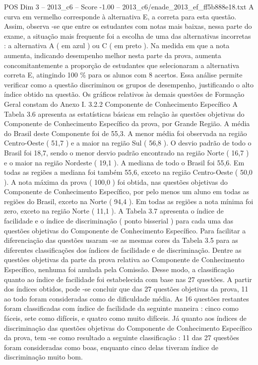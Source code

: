 \begin{textsample}{POS Dim 3 – 2013\_c6 – Score -1.00 – 2013\_c6/enade\_2013\_ef\_ff5b888e18.txt}
A curva em vermelho corresponde à alternativa E, a correta para esta questão.
Assim, observa -se que entre os estudantes com notas mais baixas, nessa parte do exame, a situação mais frequente foi a escolha de uma das alternativas incorretas : a alternativa A ( em azul ) ou C ( em preto ).
Na medida em que a nota aumenta, indicando desempenho melhor nesta parte da prova, aumenta concomitantemente a proporção de estudantes que selecionaram a alternativa correta E, atingindo 100 \% para os alunos com 8 acertos.
Essa análise permite verificar como a questão discriminou os grupos de desempenho, justificando o alto índice obtido na questão.
Os gráficos relativos às demais questões de Formação Geral constam do Anexo I. 3.2.2 Componente de Conhecimento Específico A Tabela 3.6 apresenta as estatísticas básicas em relação às questões objetivas do Componente de Conhecimento Específico da prova, por Grande Região.
A média do Brasil deste Componente foi de 55,3.
A menor média foi observada na região Centro-Oeste ( 51,7 ) e a maior na região Sul ( 56,8 ).
O desvio padrão de todo o Brasil foi 18,7, sendo o menor desvio padrão encontrado na região Norte ( 16,7 ) e o maior na região Nordeste ( 19,1 ).
A mediana de todo o Brasil foi 55,6.
Em todas as regiões a mediana foi também 55,6, exceto na região Centro-Oeste ( 50,0 ).
A nota máxima da prova ( 100,0 ) foi obtida, nas questões objetivas do Componente de Conhecimento Específico, por pelo menos um aluno em todas as regiões do Brasil, exceto na Norte ( 94,4 ).
Em todas as regiões a nota mínima foi zero, exceto na região Norte ( 11,1 ).
A Tabela 3.7 apresenta o índice de facilidade e o índice de discriminação ( ponto bisserial ) para cada uma das questões objetivas do Componente de Conhecimento Específico.
Para facilitar a diferenciação das questões usaram -se as mesmas cores da Tabela 3.5 para as diferentes classificações dos índices de facilidade e de discriminação.
Dentre as questões objetivas da parte da prova relativa ao Componente de Conhecimento Específico, nenhuma foi anulada pela Comissão.
Desse modo, a classificação quanto ao índice de facilidade foi estabelecida com base nas 27 questões.
A partir dos índices obtidos, pode -se concluir que das 27 questões objetivas da prova, 11 ao todo foram consideradas como de dificuldade média.
As 16 questões restantes foram classificadas com índice de facilidade da seguinte maneira : cinco como fáceis, sete como difíceis, e quatro como muito difíceis.
Já quanto aos índices de discriminação das questões objetivas do Componente de Conhecimento Específico da prova, tem -se como resultado a seguinte classificação : 11 das 27 questões foram consideradas como boas, enquanto cinco delas tiveram índice de discriminação muito bom.

\end{textsample}
